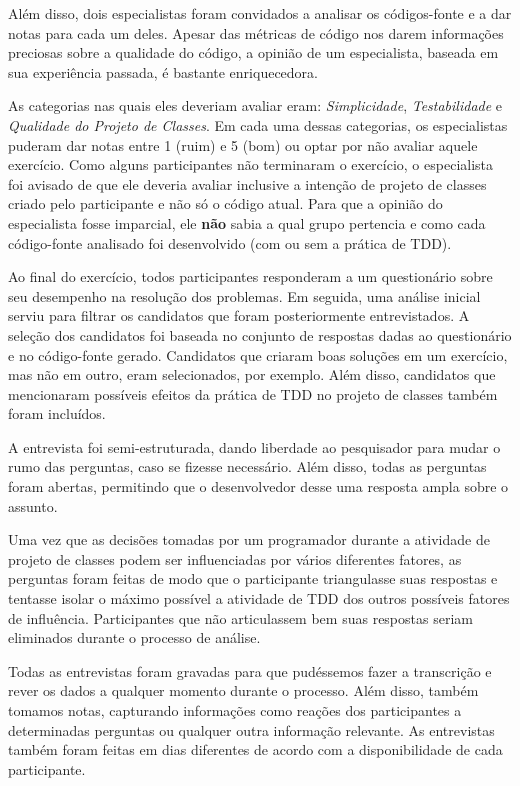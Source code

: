 \documentclass[conference]{IEEEtran}
\begin{document}
Além disso, dois especialistas foram convidados a analisar os códigos-fonte e a dar notas para cada
um deles. Apesar das métricas de código nos darem informações
preciosas sobre a qualidade do código, a opinião de um especialista, baseada
em sua experiência passada, é bastante enriquecedora.

As categorias nas quais eles deveriam avaliar eram: \textit{Simplicidade}, \textit{Testabilidade} e
\textit{Qualidade do Projeto de Classes}.
Em cada uma dessas categorias, os especialistas puderam dar notas entre
1 (ruim) e 5 (bom) ou optar por não avaliar aquele exercício.
Como alguns participantes não terminaram o exercício, o especialista
foi avisado de que ele deveria avaliar inclusive a intenção de projeto de classes criado
pelo participante e não só o código atual. 
Para que a opinião do especialista fosse imparcial, ele \textbf{não} sabia a qual grupo
pertencia e como cada código-fonte analisado foi desenvolvido (com ou sem a prática de TDD).

Ao final do exercício, todos participantes
responderam a um questionário sobre seu desempenho na resolução dos problemas.
Em seguida, uma análise inicial serviu para filtrar os candidatos
que foram posteriormente entrevistados. A seleção dos candidatos foi baseada
no conjunto de respostas dadas ao questionário e no código-fonte gerado. Candidatos
que criaram boas soluções em um exercício, mas não em outro, eram selecionados, por exemplo.
Além disso, candidatos que mencionaram possíveis efeitos da prática de TDD no projeto de classes
também foram incluídos.

A entrevista foi semi-estruturada, dando liberdade ao
pesquisador para mudar o rumo das perguntas, caso se fizesse necessário.
Além disso, todas as perguntas foram abertas, permitindo que o desenvolvedor desse
uma resposta ampla sobre o assunto.

Uma vez que as decisões tomadas por um programador durante a atividade de projeto de classes
podem ser influenciadas por vários diferentes fatores, 
as perguntas foram feitas de modo que o participante triangulasse suas respostas
e tentasse isolar o máximo possível a atividade de TDD dos outros possíveis fatores
de influência. Participantes que não articulassem bem suas respostas seriam eliminados
durante o processo de análise.

Todas as entrevistas foram gravadas para que pudéssemos fazer a
transcrição e rever os dados a qualquer momento durante o processo. Além disso,
também tomamos notas, capturando informações como reações dos 
participantes a determinadas perguntas ou qualquer outra informação relevante. 
As entrevistas também foram feitas em dias diferentes de acordo com a disponibilidade
de cada participante.
\end{document}
